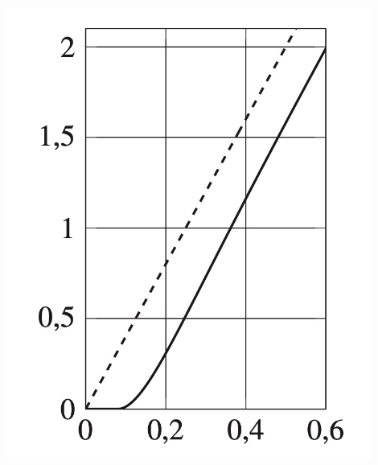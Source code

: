 \begin{minipage}{0.4\textwidth}
{
\begin{center}
\includegraphics[width=0.9\textwidth]{images/NL0}
\end{center}
}
\end{minipage}

